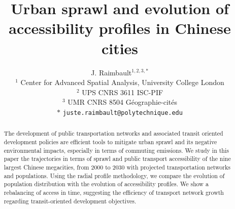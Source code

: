 \documentclass{article}
\begin{document}



\title{\vspace{-2cm}Urban sprawl and evolution of accessibility profiles in Chinese cities}


\author{J. Raimbault$^{1,2,3,\ast}$\\
$^{1}$ Center for Advanced Spatial Analysis, University College London\\
$^{2}$ UPS CNRS 3611 ISC-PIF\\
$^{3}$ UMR CNRS 8504 G{\'e}ographie-cit{\'e}s\medskip\\
$\ast$ \texttt{juste.raimbault@polytechnique.edu}
}

\date{}

\maketitle


\begin{abstract}
The development of public transportation networks and associated transit oriented development policies are efficient tools to mitigate urban sprawl and its negative environmental impacts, especially in terms of commuting emissions. We study in this paper the trajectories in terms of sprawl and public transport accessibility of the nine largest Chinese megacities, from 2000 to 2030 with projected transportation networks and populations. Using the radial profile methodology, we compare the evolution of population distribution with the evolution of accessibility profiles. We show a rebalancing of access in time, suggesting the efficiency of transport network growth regarding transit-oriented development objectives.
\end{abstract}
\end{document}
